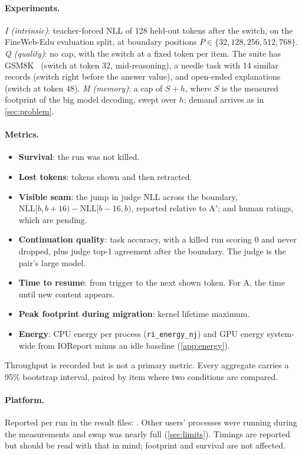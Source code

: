 \paragraph{Experiments.}
\emph{I (intrinsic)}: teacher-forced NLL of 128 held-out tokens after the switch, on the FineWeb-Edu evaluation split, at boundary positions $P\in\{32,128,256,512,768\}$.
\emph{Q (quality)}: no cap, with the switch at a fixed token per item.
The suite has GSM8K~\citep{cobbe2021gsm8k} (switch at token 32, mid-reasoning), a needle task with 14 similar records (switch right before the answer value), and open-ended explanations (switch at token 48).
\emph{M (memory)}: a cap of $S+h$, where $S$ is the measured footprint of the big model decoding, swept over $h$; demand arrives as in \cref{sec:problem}.

\paragraph{Metrics.}
\begin{itemize}
\item \textbf{Survival}: the run was not killed.
\item \textbf{Lost tokens}: tokens shown and then retracted.
\item \textbf{Visible seam}: the jump in judge NLL across the boundary, $\overline{\text{NLL}}[b,b{+}16)-\overline{\text{NLL}}[b{-}16,b)$, reported relative to A$'$; and human ratings, which are pending.
\item \textbf{Continuation quality}: task accuracy, with a killed run scoring 0 and never dropped, plus judge top-1 agreement after the boundary. The judge is the pair's large model.
\item \textbf{Time to resume}: from trigger to the next shown token. For A, the time until new content appears.
\item \textbf{Peak footprint during migration}: kernel lifetime maximum.
\item \textbf{Energy}: CPU energy per process (\texttt{ri\_energy\_nj}) and GPU energy system-wide from IOReport minus an idle baseline (\cref{app:energy}).
\end{itemize}
Throughput is recorded but is not a primary metric.
Every aggregate carries a 95\% bootstrap interval, paired by item where two conditions are compared.

\paragraph{Platform.}
Reported per run in the result files: .
Other users' processes were running during the measurements and swap was nearly full (\cref{sec:limits}).
Timings are reported but should be read with that in mind; footprint and survival are not affected.

